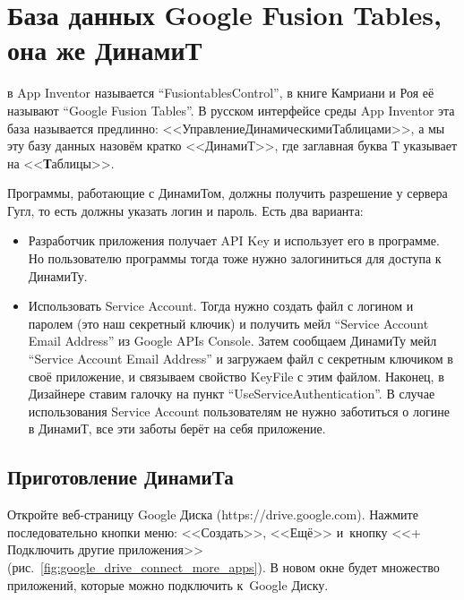 \chapter{База данных Google Fusion Tables, она же ДинамиТ}
\label{ch:dynamite}


 в App Inventor называется ``FusiontablesControl'', 
в книге Камриани и Роя\cite{KamrianiAndRoy2016} её называют ``Google Fusion Tables''. 
В русском интерфейсе среды App Inventor эта база называется предлинно: 
<<УправлениеДинамическимиТаблицами>>, а мы эту базу данных назовём кратко <<ДинамиТ>>, 
где заглавная буква Т указывает на <<\textbf{Т}аблицы>>.

Программы, работающие с ДинамиТом, должны получить разрешение у сервера Гугл, то есть должны указать логин и пароль. Есть два варианта:
\begin{itemize}
    \item Разработчик приложения получает API Key и использует его в программе. 
        Но пользователю программы тогда тоже нужно залогиниться для доступа к ДинамиТу. 
    \item Использовать Service Account. Тогда нужно создать 
        файл с логином и паролем (это наш секретный ключик) и получить 
        мейл ``Service Account Email Address'' из Google APIs Console. 
        Затем сообщаем ДинамиТу мейл ``Service Account Email Address'' 
        и загружаем файл с секретным ключиком в своё приложение, 
        и связываем свойство KeyFile с этим файлом. 
        Наконец, в Дизайнере ставим галочку на пункт ``UseServiceAuthentication''. 
        В случае использования Service Account 
        пользователям не нужно заботиться о логине в ДинамиТ, 
        все эти заботы берёт на себя приложение.
\end{itemize}




\section{Приготовление ДинамиТа}


Откройте веб-страницу Google Диска (https://drive.google.com).
Нажмите последовательно 
кнопки меню: <<Создать>>, <<Ещё>> и~кнопку <<+ Подключить другие приложения>> 
(рис.~\ref{fig:google_drive_connect_more_apps}). В новом окне будет множество 
приложений, которые можно подключить к~Google Диску. 

